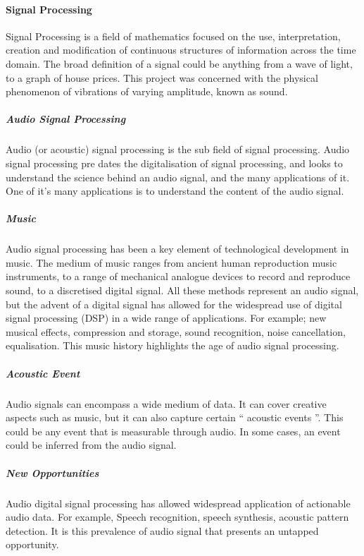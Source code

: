 \documentclass{UoNMCHA}
\newcommand{\inlineQuote}[1]{`` #1 ''}
\numberwithin{equation}{section}
\begin{document}
\paragraph{Signal Processing}
Signal Processing is a field of mathematics focused on the use, interpretation, creation and modification of continuous structures of information across the time domain. The broad definition of a signal could be anything from a wave of light, to a graph of house prices. This project was concerned with the physical phenomenon of vibrations of varying amplitude, known as sound.

\subparagraph{Audio Signal Processing}
Audio (or acoustic) signal processing is the sub field of signal processing. Audio signal processing pre dates the digitalisation of signal processing, and looks to understand the science behind an audio signal, and the many applications of it. One of it's many applications is to understand the content of the audio signal.

\subparagraph{Music}
Audio signal processing has been a key element of technological development in music. The medium of music ranges from ancient human reproduction music instruments, to a range of mechanical analogue devices to record and reproduce sound, to a discretised digital signal. All these methods represent an audio signal, but the advent of a digital signal has allowed for the widespread use of digital signal processing (DSP) in a wide range of applications. For example; new musical effects, compression and storage, sound recognition, noise cancellation, equalisation. This music history highlights the age of audio signal processing.

\subparagraph{Acoustic Event}
Audio signals can encompass a wide medium of data. It can cover creative aspects such as music, but it can also capture certain \inlineQuote{acoustic events}. This could be any event that is measurable through audio. In some cases, an event could be inferred from the audio signal.

\subparagraph{New Opportunities}
Audio digital signal processing has allowed widespread application of actionable audio data. For example, Speech recognition, speech synthesis, acoustic pattern detection. It is this prevalence of audio signal that presents an untapped opportunity.
\end{document}
